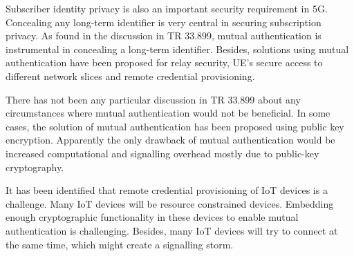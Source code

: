 \documentclass[12pt]{llncs}
\begin{document}
Subscriber identity privacy is also an important security requirement in 5G. Concealing any long-term  identifier is very central in securing subscription privacy. As found in the discussion in TR 33.899, mutual authentication is instrumental in concealing a long-term identifier. Besides, solutions using mutual authentication have been proposed for relay security, UE's secure access to different network slices and remote credential provisioning.

There has not been any particular discussion in TR 33.899 about any circumstances where mutual authentication would not be beneficial. In some cases, the solution of mutual authentication has been proposed using public key encryption. Apparently the only drawback of mutual authentication would be  increased computational and signalling overhead mostly due to public-key cryptography.

It has been identified that remote credential provisioning of IoT devices is a challenge. Many IoT devices will be resource constrained devices. Embedding enough cryptographic functionality in these devices to enable mutual authentication is challenging. Besides, many IoT devices will try to connect at the same time, which might create a signalling storm.
\end{document}
